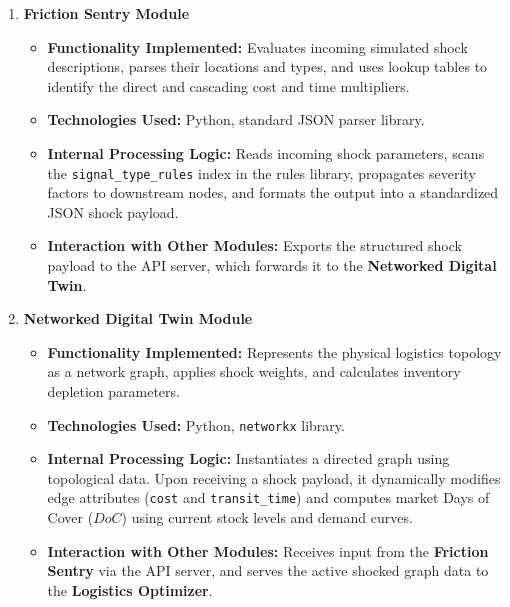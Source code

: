 \begin{enumerate}
    \item \textbf{Friction Sentry Module}
    \begin{itemize}
        \item \textbf{Functionality Implemented:} Evaluates incoming simulated shock descriptions, parses their locations and types, and uses lookup tables to identify the direct and cascading cost and time multipliers.
        \item \textbf{Technologies Used:} Python, standard JSON parser library.
        \item \textbf{Internal Processing Logic:} Reads incoming shock parameters, scans the \texttt{signal\_type\_rules} index in the rules library, propagates severity factors to downstream nodes, and formats the output into a standardized JSON shock payload.
        \item \textbf{Interaction with Other Modules:} Exports the structured shock payload to the API server, which forwards it to the \textbf{Networked Digital Twin}.
    \end{itemize}

    \item \textbf{Networked Digital Twin Module}
    \begin{itemize}
        \item \textbf{Functionality Implemented:} Represents the physical logistics topology as a network graph, applies shock weights, and calculates inventory depletion parameters.
        \item \textbf{Technologies Used:} Python, \texttt{networkx} library.
        \item \textbf{Internal Processing Logic:} Instantiates a directed graph using topological data. Upon receiving a shock payload, it dynamically modifies edge attributes (\texttt{cost} and \texttt{transit\_time}) and computes market Days of Cover ($DoC$) using current stock levels and demand curves.
        \item \textbf{Interaction with Other Modules:} Receives input from the \textbf{Friction Sentry} via the API server, and serves the active shocked graph data to the \textbf{Logistics Optimizer}.
    \end{itemize}


\end{enumerate}
